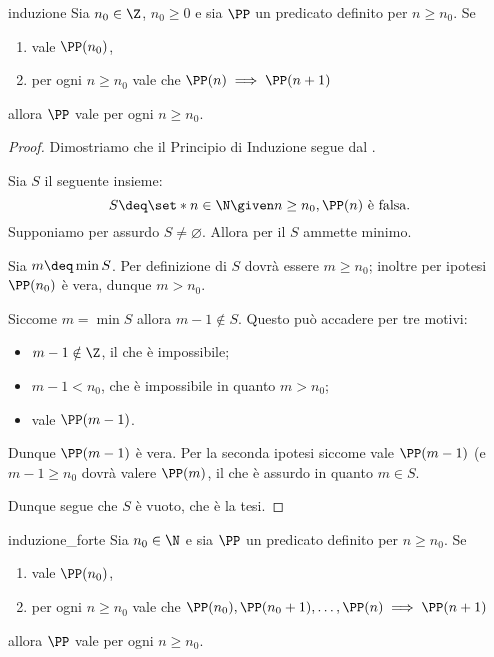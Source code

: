 \begin{theorem}
     {induzione} Sia $n_0 \in \Z$, $n_0 \geq 0$ e sia $\PP$ un predicato definito per $n \geq n_0$. Se \begin{enumerate}
        \item vale $\PP(n_0)$,
        \item per ogni $n \geq n_0$ vale che $\PP(n) \implies \PP(n+1)$
    \end{enumerate}
    allora $\PP$ vale per ogni $n \geq n_0$.
\end{theorem}
\begin{proof}
    Dimostriamo che il Principio di Induzione segue dal .

    Sia $S$ il seguente insieme: \[
        S \deq \set*{n \in \N \given n\geq n_0, \PP(n) \text{ è falsa}}.    
    \] Supponiamo per assurdo $S \neq \varnothing$. Allora per il  $S$ ammette minimo. 
    
    Sia $m \deq \min S$. Per definizione di $S$ dovrà essere $m \geq n_0$; inoltre per ipotesi $\PP(n_0)$ è vera, dunque $m > n_0$.

    Siccome $m = \min S$ allora $m - 1 \notin S$. Questo può accadere per tre motivi: \begin{itemize}
        \item $m - 1 \notin \Z$, il che è impossibile;
        \item $m - 1 < n_0$, che è impossibile in quanto $m > n_0$;
        \item vale $\PP(m-1)$.
    \end{itemize}

    Dunque $\PP(m-1)$ è vera. Per la seconda ipotesi siccome vale $\PP(m-1)$ (e $m - 1 \geq n_0$ dovrà valere $\PP(m)$, il che è assurdo in quanto $m \in S$.

    Dunque segue che $S$ è vuoto, che è la tesi.
\end{proof}

\begin{theorem}
     {induzione_forte} Sia $n_0 \in \N$ e sia $\PP$ un predicato definito per $n \geq n_0$. Se \begin{enumerate}
        \item vale $\PP(n_0)$,
        \item per ogni $n \geq n_0$ vale che $\PP(n_0), \PP(n_0 + 1), \dots, \PP(n) \implies \PP(n+1)$
    \end{enumerate}
    allora $\PP$ vale per ogni $n \geq n_0$.
\end{theorem}

